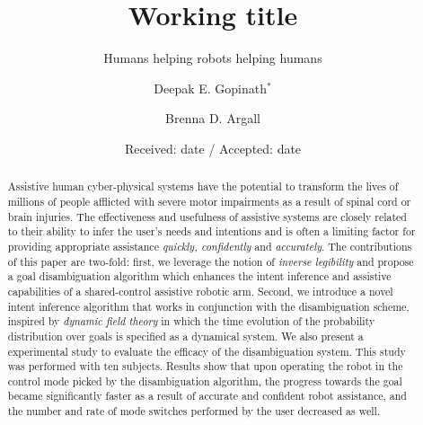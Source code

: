 \title{Working title%
}
\subtitle{Humans helping robots helping humans}


\author{Deepak E. Gopinath$^*$      \and
        Brenna D. Argall %
}



\date{Received: date / Accepted: date}


\maketitle

\begin{abstract}
Assistive human cyber-physical systems have the potential to transform the lives of millions of people afflicted with severe motor impairments as a result of spinal cord or brain injuries. The effectiveness and usefulness of assistive systems are closely related to their ability to infer the user's needs and intentions and is often a limiting factor for providing appropriate assistance \textit{quickly, confidently} and \textit{accurately}. The contributions of this paper are two-fold: first, we leverage the notion of \textit{inverse legibility} and propose a goal disambiguation algorithm which enhances the intent inference and assistive capabilities of a shared-control assistive robotic arm. Second, we introduce a novel intent inference algorithm that works in conjunction with the disambiguation scheme, inspired by \textit{dynamic field theory} in which the time evolution of the probability distribution over goals is specified as a dynamical system. We also present a experimental study to evaluate the efficacy of the disambiguation system. This study was performed with ten subjects. Results show that upon operating the robot in the control mode picked by the disambiguation algorithm, the progress towards the goal became significantly faster as a result of accurate and confident robot assistance, and the number and rate of mode switches performed by the user decreased as well. 
\end{abstract}

